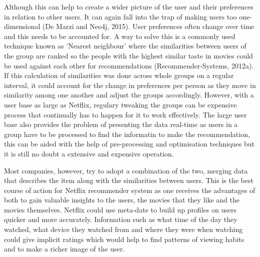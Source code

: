 \documentclass[a4paper]{article}
\begin{document}
Although this can help to create a wider picture of the user and their preferences in relation to other users. It can again fall into the trap of making users too one-dimensional (De Marzi and Neo4j, 2015). User preferences often change over time and this needs to be accounted for. A way to solve this is a commonly used technique known as 'Nearest neighbour' where the similarities between users of the group are ranked so the people with the highest similar taste in movies could be used against each other for recommendations (Recommender-Systems, 2012a). If this calculation of similarities was done across whole groups on a regular interval, it could account for the change in preferences per person as they move in similarity among one another and adjust the groups accordingly. However, with a user base as large as Netflix, regulary tweaking the groups can be expensive process that continually has to happen for it to work effectively. The large user base also provides the problem of presenting the data real-time as users in a group have to be processed to find the informatin to make the recommendation, this can be aided with the help of pre-processing and optimisation techniques but it is still no doubt a extensive and expensive operation.

Most companies, however, try to adopt a combination of the two, merging data that describes the item along with the similarities between users. This is the best course of action for Netflix recommender system as one receives the advantages of both to gain valuable insights to the users, the movies that they like and the movies themselves. Netflix could use meta-date to build up profiles on users quicker and more accurately. Information such as what time of the day they watched, what device they watched from and where they were when watching could give implicit ratings which would help to find patterns of viewing habits and to make a richer image of the user. \par
\end{document}

